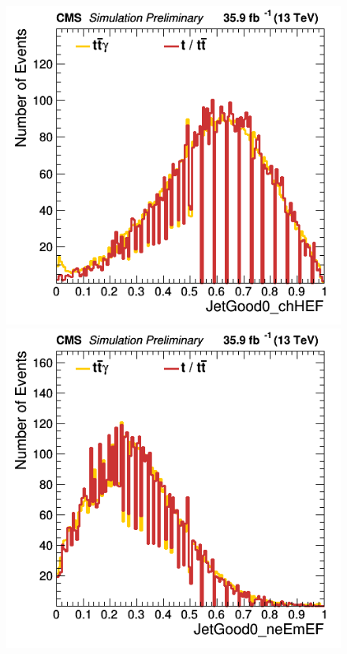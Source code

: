 \documentclass[11pt]{scrartcl}
\begin{document}
	\begin{figure}[H]
	\centering
	\begin{minipage}{.5\textwidth}
	  \centering
	  \includegraphics[width=0.75\linewidth]{figures/Notused/JetGood0_chHEF.png}
	\end{minipage}%
	\begin{minipage}{.5\textwidth}
	  \centering
	  \includegraphics[width=0.75\linewidth]{figures/Notused/JetGood0_neEmEF.png}
	\end{minipage}
	\end{figure}
	
\end{document}
